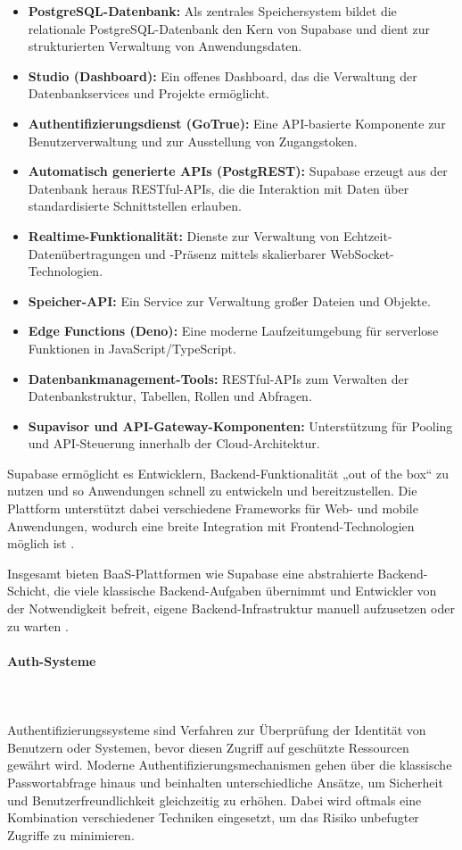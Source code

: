 \begin{itemize}
\item \textbf{PostgreSQL-Datenbank:} Als zentrales Speichersystem bildet die relationale PostgreSQL-Datenbank den Kern von Supabase und dient zur strukturierten Verwaltung von Anwendungsdaten.
\item \textbf{Studio (Dashboard):} Ein offenes Dashboard, das die Verwaltung der Datenbankservices und Projekte ermöglicht.
\item \textbf{Authentifizierungsdienst (GoTrue):} Eine API-basierte Komponente zur Benutzerverwaltung und zur Ausstellung von Zugangstoken.
\item \textbf{Automatisch generierte APIs (PostgREST):} Supabase erzeugt aus der Datenbank heraus RESTful-APIs, die die Interaktion mit Daten über standardisierte Schnittstellen erlauben.
\item \textbf{Realtime-Funktionalität:} Dienste zur Verwaltung von Echtzeit-Datenübertragungen und -Präsenz mittels skalierbarer WebSocket-Technologien.
\item \textbf{Speicher-API:} Ein Service zur Verwaltung großer Dateien und Objekte.
\item \textbf{Edge Functions (Deno):} Eine moderne Laufzeitumgebung für serverlose Funktionen in JavaScript/TypeScript.
\item \textbf{Datenbankmanagement-Tools:} RESTful-APIs zum Verwalten der Datenbankstruktur, Tabellen, Rollen und Abfragen.
\item \textbf{Supavisor und API-Gateway-Komponenten:} Unterstützung für Pooling und API-Steuerung innerhalb der Cloud-Architektur.
\end{itemize}

Supabase ermöglicht es Entwicklern, Backend-Funktionalität „out of the box“ zu nutzen und so Anwendungen schnell zu entwickeln und bereitzustellen. Die Plattform unterstützt dabei verschiedene Frameworks für Web- und mobile Anwendungen, wodurch eine breite Integration mit Frontend-Technologien möglich ist \cite{supabase_overview_chauhan}.

Insgesamt bieten BaaS-Plattformen wie Supabase eine abstrahierte Backend-Schicht, die viele klassische Backend-Aufgaben übernimmt und Entwickler von der Notwendigkeit befreit, eigene Backend-Infrastruktur manuell aufzusetzen oder zu warten \cite{supabase_overview_chauhan}.

\paragraph{Auth-Systeme}
\mbox{}\\
\mbox{}\\
Authentifizierungssysteme sind Verfahren zur Überprüfung der Identität von Benutzern oder Systemen, bevor diesen Zugriff auf geschützte Ressourcen gewährt wird. Moderne Authentifizierungsmechanismen gehen über die klassische Passwortabfrage hinaus und beinhalten unterschiedliche Ansätze, um Sicherheit und Benutzerfreundlichkeit gleichzeitig zu erhöhen. Dabei wird oftmals eine Kombination verschiedener Techniken eingesetzt, um das Risiko unbefugter Zugriffe zu minimieren.\cite{it_schulungen_modern_auth}

